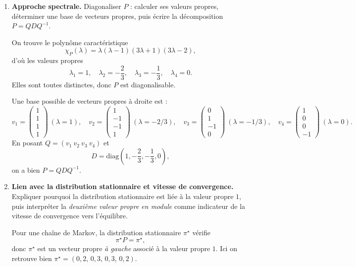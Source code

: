 \begin{enumerate}[label=\alph*), itemsep=0.6em]
\begin{solution}
\end{solution}
  \item \textbf{Approche spectrale.} Diagonaliser $P$ : calculer ses valeurs propres, déterminer une base de vecteurs propres, puis écrire la décomposition $P = QDQ^{-1}$.

\begin{solution}
On trouve le polynôme caractéristique
\[
\chi_P(\lambda)=\lambda(\lambda-1)(3\lambda+1)(3\lambda-2),
\]
d'où les valeurs propres
\[
\lambda_1=1,\quad \lambda_2=-\frac23,\quad \lambda_3=-\frac13,\quad \lambda_4=0.
\]
Elles sont toutes distinctes, donc $P$ est diagonalisable.

Une base possible de vecteurs propres à droite est :
\[
v_1=\begin{pmatrix}1\\1\\1\\1\end{pmatrix} \ (\lambda=1),\quad
v_2=\begin{pmatrix}1\\-1\\-1\\1\end{pmatrix} \ (\lambda=-2/3),\quad
v_3=\begin{pmatrix}0\\1\\-1\\0\end{pmatrix} \ (\lambda=-1/3),\quad
v_4=\begin{pmatrix}1\\0\\0\\-1\end{pmatrix} \ (\lambda=0).
\]
En posant $Q=(v_1\ v_2\ v_3\ v_4)$ et
\[
D=\mathrm{diag}\!\left(1,-\frac23,-\frac13,0\right),
\]
on a bien $P=QDQ^{-1}$.
\end{solution}

  \item \textbf{Lien avec la distribution stationnaire et vitesse de convergence.}
  Expliquer pourquoi la distribution stationnaire est liée à la valeur propre $1$, puis interpréter la \emph{deuxième valeur propre en module} comme indicateur de la vitesse de convergence vers l'équilibre.

\begin{solution}
Pour une chaîne de Markov, la distribution stationnaire $\pi^\star$ vérifie
\[
\pi^\star P=\pi^\star,
\]
donc $\pi^\star$ est un vecteur propre \emph{à gauche} associé à la valeur propre $1$.
Ici on retrouve bien $\pi^\star=(0{,}2,\,0{,}3,\,0{,}3,\,0{,}2)$.


\end{solution}
\end{enumerate}
